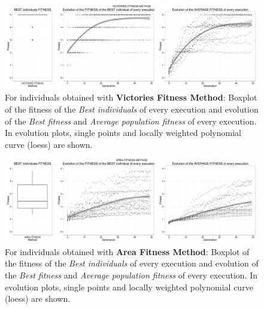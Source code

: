 \documentclass[preprint]{elsarticle}
\begin{document}



\begin{figure}[ht]
 \begin{center}
   \includegraphics[width=12cm]{nuevas_imgs/estudio_turns.pdf}
 \end{center} %
 \caption{For individuals obtained with \textbf{Victories Fitness Method}: Boxplot of the fitness of the \emph{Best individuals} of every execution and evolution of the \emph{Best fitness} and \emph{Average population fitness} of every execution. In evolution plots, single points and locally weighted polynomial curve (loess) are shown.}
 \label{figura:fitness_turns}
 \end{figure}

   \begin{figure}[ht]
 \begin{center}
   \includegraphics[width=12cm]{nuevas_imgs/estudio_area.pdf}
 \end{center}
 \caption{For individuals obtained with \textbf{Area Fitness Method}: Boxplot of the fitness of the \emph{Best individuals} of every execution and evolution of the \emph{Best fitness} and \emph{Average population fitness} of every execution. In evolution plots, single points and locally weighted polynomial curve (loess) are shown.}
 \label{figura:fitness_area}
 \end{figure}
\end{document}
